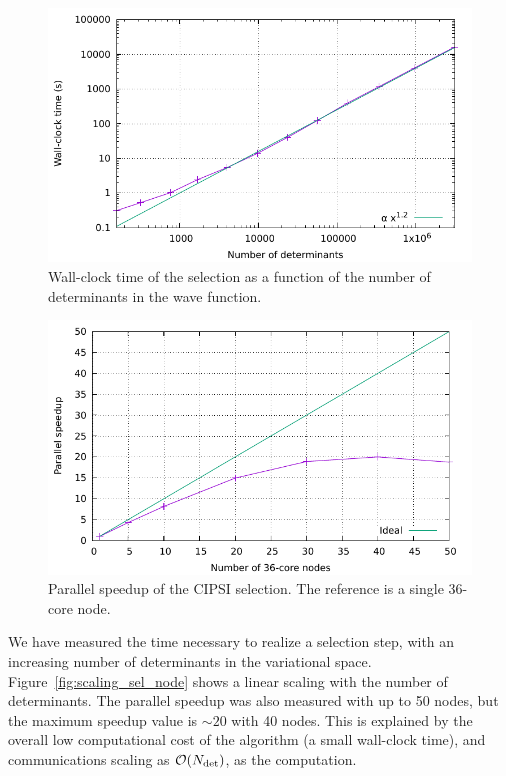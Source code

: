 \documentclass[./thesis.tex]{subfiles}
\begin{document}
\begin{figure}[hbt]
    \begin{center}
      \includegraphics[width=0.8\columnwidth]{figures/perf/scaling_sel_det}
      \caption{Wall-clock time of the selection as a function of the number of
determinants in the wave function.}
      \label{fig:scaling_sel_ndet}
    \end{center}
\end{figure}

\begin{figure}[h]
    \begin{center}
      \includegraphics[width=0.8\columnwidth]{figures/perf/scaling_sel_node}
      \caption{Parallel speedup of the CIPSI selection. The reference is a single 36-core node.}
      \label{fig:speedup_sel_node}
    \end{center}
\end{figure}

We have measured the time necessary to realize a selection step, with an
increasing number of determinants in the variational space.
Figure~\ref{fig:scaling_sel_node} shows a linear scaling with the number of
determinants. The parallel speedup was also measured with up to 50 nodes, but
the maximum speedup value is $\sim 20$ with 40 nodes. This is explained by
the overall low computational cost of the algorithm (a small wall-clock time), 
and communications scaling as $\order{\Ndet}$, as the computation.
\end{document}
